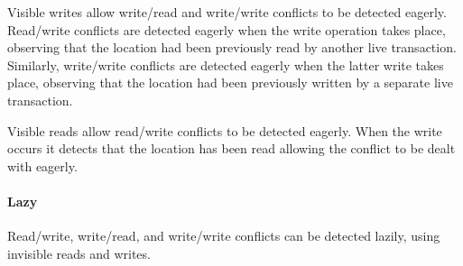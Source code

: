 Visible writes allow write/read and write/write conflicts to be detected eagerly.
Read/write conflicts are detected eagerly when the write operation takes place, observing that the location
had been previously read by another live transaction.
Similarly, write/write conflicts are detected eagerly when the latter write takes place, observing that
the location  had been previously written by a separate live transaction.

Visible reads allow read/write conflicts to be detected eagerly.
When the write occurs it detects that the location has been read allowing
the conflict to be dealt with eagerly.

% 

\paragraph{Lazy}
Read/write, write/read, and write/write conflicts can be detected lazily,
using invisible reads and writes.

